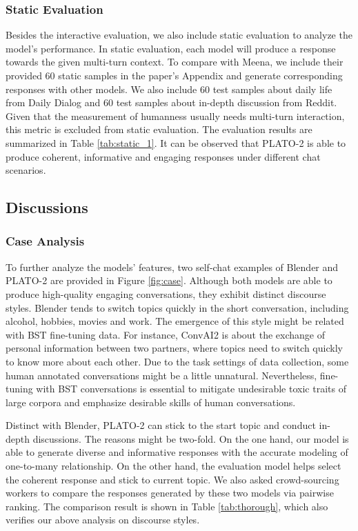 \documentclass[11pt,a4paper]{article}
\begin{document}
	\subsubsection{Static Evaluation}
	Besides the interactive evaluation, we also include static evaluation to analyze the model's performance. In static evaluation, each model will produce a response towards the given multi-turn context. To compare with Meena, we include their provided 60 static samples in the paper's Appendix and generate corresponding responses with other models. We also include 60 test samples about daily life from Daily Dialog \cite{li2017dailydialog} and 60 test samples about in-depth discussion from Reddit. Given that the measurement of humanness usually needs multi-turn interaction, this metric is excluded from static evaluation. The evaluation results are summarized in Table \ref{tab:static_1}. It can be observed that PLATO-2 is able to produce coherent, informative and engaging responses under different chat scenarios.
	
	\subsection{Discussions}
	\subsubsection{Case Analysis}
	To further analyze the models' features, two self-chat examples of Blender and PLATO-2 are provided in Figure \ref{fig:case}. Although both models are able to produce high-quality engaging conversations, they exhibit distinct discourse styles. Blender tends to switch topics quickly in the short conversation, including alcohol, hobbies, movies and work. The emergence of this style might be related with BST fine-tuning data. For instance, ConvAI2 is about the exchange of personal information between two partners, where topics need to switch quickly to know more about each other. Due to the task settings of data collection, some human annotated conversations might be a little unnatural. Nevertheless, fine-tuning with BST conversations is essential to mitigate undesirable toxic traits of large corpora and emphasize desirable skills of human conversations. 
	
	Distinct with Blender, PLATO-2 can stick to the start topic and conduct in-depth discussions. The reasons might be two-fold. On the one hand, our model is able to generate diverse and informative responses with the accurate modeling of one-to-many relationship. On the other hand, the evaluation model helps select the coherent response and stick to current topic. We also asked crowd-sourcing workers to compare the responses generated by these two models via pairwise ranking. The comparison result is shown in Table \ref{tab:thorough}, which also verifies our above analysis on discourse styles. 
	
\end{document}
